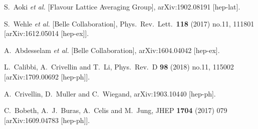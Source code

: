 \documentclass[11pt,amsmath,amssymb]{article}
\begin{document}
\begin{thebibliography}{99}
  S.~Aoki {\it et al.} [Flavour Lattice Averaging Group],
  arXiv:1902.08191 [hep-lat].
  
  S.~Wehle {\it et al.} [Belle Collaboration],
  Phys.\ Rev.\ Lett.\  {\bf 118} (2017) no.11,  111801
  [arXiv:1612.05014 [hep-ex]].


   A.~Abdesselam {\it et al.} [Belle Collaboration],
  arXiv:1604.04042 [hep-ex].
  
  L.~Calibbi, A.~Crivellin and T.~Li,
  Phys.\ Rev.\ D {\bf 98} (2018) no.11,  115002
  [arXiv:1709.00692 [hep-ph]].
  
  
  A.~Crivellin, D.~Muller and C.~Wiegand,
  arXiv:1903.10440 [hep-ph].

  C.~Bobeth, A.~J.~Buras, A.~Celis and M.~Jung,
  JHEP {\bf 1704} (2017) 079
  [arXiv:1609.04783 [hep-ph]].

\end{thebibliography}
\end{document}
